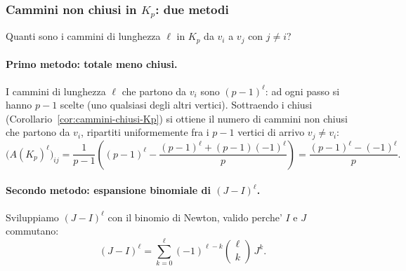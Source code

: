 

\subsubsection{Cammini non chiusi in $ K_p $: due metodi}

Quanti sono i cammini di lunghezza $ \ell $ in $ K_p $ da $ v_i $ a $ v_j $ con $ j \neq i $?

\paragraph{Primo metodo: totale meno chiusi.}

I cammini di lunghezza $ \ell $ che partono da $ v_i $ sono $ (p-1)^\ell $: ad ogni passo si hanno $ p - 1 $ scelte (uno qualsiasi degli altri vertici). Sottraendo i chiusi (Corollario~\ref{cor:cammini-chiusi-Kp}) si ottiene il numero di cammini non chiusi che partono da $ v_i $, ripartiti uniformemente fra i $ p - 1 $ vertici di arrivo $ v_j \neq v_i $:
\[
  \bigl(A(K_p)^\ell\bigr)_{ij}
    = \frac{1}{p-1}\!\left( (p-1)^\ell - \frac{(p-1)^\ell + (p-1)(-1)^\ell}{p} \right)
    = \frac{(p-1)^\ell - (-1)^\ell}{p} .
\]

\paragraph{Secondo metodo: espansione binomiale di $ (J - I)^\ell $.}

Sviluppiamo $ (J - I)^\ell $ con il binomio di Newton, valido perche' $ I $ e $ J $ commutano:
\[
  (J - I)^\ell = \sum_{k=0}^{\ell} (-1)^{\ell - k} \binom{\ell}{k}\, J^k .
\]

